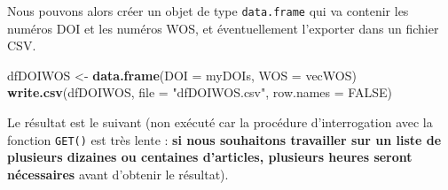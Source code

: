 \documentclass[]{book}
\newenvironment{Shaded}{\begin{snugshade}}{\end{snugshade}}
\newcommand{\KeywordTok}[1]{\textcolor[rgb]{0.13,0.29,0.53}{\textbf{#1}}}
\newcommand{\DataTypeTok}[1]{\textcolor[rgb]{0.13,0.29,0.53}{#1}}
\newcommand{\DecValTok}[1]{\textcolor[rgb]{0.00,0.00,0.81}{#1}}
\newcommand{\StringTok}[1]{\textcolor[rgb]{0.31,0.60,0.02}{#1}}
\newcommand{\OtherTok}[1]{\textcolor[rgb]{0.56,0.35,0.01}{#1}}
\newcommand{\ControlFlowTok}[1]{\textcolor[rgb]{0.13,0.29,0.53}{\textbf{#1}}}
\newcommand{\OperatorTok}[1]{\textcolor[rgb]{0.81,0.36,0.00}{\textbf{#1}}}
\newcommand{\NormalTok}[1]{#1}
\theoremstyle{definition}
\theoremstyle{definition}
\theoremstyle{definition}
\theoremstyle{remark}
\begin{document}
\begin{Shaded}
\end{Shaded}

Nous pouvons alors créer un objet de type \texttt{data.frame} qui va
contenir les numéros DOI et les numéros WOS, et éventuellement
l'exporter dans un fichier CSV.

\begin{Shaded}
\begin{Highlighting}[]
\NormalTok{dfDOIWOS <-}\StringTok{ }\KeywordTok{data.frame}\NormalTok{(}\DataTypeTok{DOI =}\NormalTok{ myDOIs, }\DataTypeTok{WOS =}\NormalTok{ vecWOS)}
\KeywordTok{write.csv}\NormalTok{(dfDOIWOS, }\DataTypeTok{file =} \StringTok{"dfDOIWOS.csv"}\NormalTok{, }\DataTypeTok{row.names =} \OtherTok{FALSE}\NormalTok{)}
\end{Highlighting}
\end{Shaded}

Le résultat est le suivant (non exécuté car la procédure d'interrogation
avec la fonction \texttt{GET()} est très lente : \textbf{si nous
souhaitons travailler sur un liste de plusieurs dizaines ou centaines
d'articles, plusieurs heures seront nécessaires} avant d'obtenir le
résultat).
\end{document}
